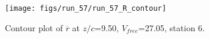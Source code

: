 \begin{figure}[H]
\centering
\texttt{[image: figs/run\_57/run\_57\_R\_contour]}
\caption{Contour plot of $\overline{r}$ at $z/c$=9.50, $V_{free}$=27.05, station 6.}
\end{figure}


